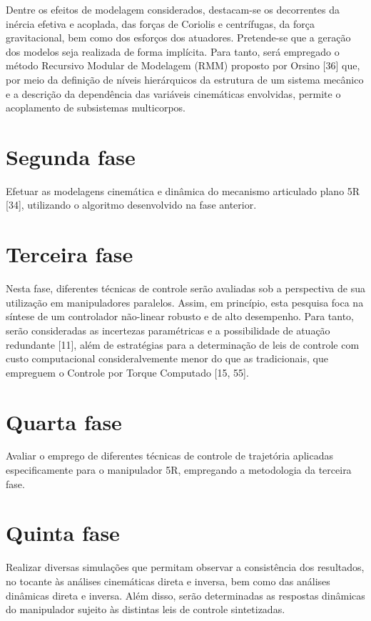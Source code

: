 \documentclass[]{politex}
\begin{document}
Dentre os efeitos de modelagem considerados, destacam-se os decorrentes da inércia efetiva e acoplada, das forças de Coriolis e centrífugas, da força gravitacional, bem como dos esforços dos atuadores. Pretende-se que a geração dos modelos seja realizada de forma implícita. Para tanto, será empregado o método Recursivo Modular de Modelagem (RMM) proposto por Orsino [36] que, por meio da definição de níveis hierárquicos da estrutura de um sistema mecânico e a descrição da dependência das variáveis cinemáticas envolvidas,  permite o acoplamento de subsistemas multicorpos.

\section{Segunda fase} 
Efetuar as modelagens cinemática e dinâmica do mecanismo articulado plano 5R [34], utilizando o algoritmo desenvolvido na fase anterior.

\section{Terceira fase} 
Nesta fase, diferentes técnicas de controle serão avaliadas sob a perspectiva de sua utilização em manipuladores paralelos. Assim, 
em princípio, esta pesquisa foca na síntese de um controlador não-linear robusto e de alto desempenho. Para tanto, serão consideradas as incertezas paramétricas e a possibilidade de atuação redundante [11], além de estratégias para a determinação de leis de controle com custo computacional
consideralvemente menor do que as tradicionais, que empreguem o Controle por Torque Computado [15, 55].

\section{Quarta fase} Avaliar o emprego de diferentes técnicas de controle de trajetória aplicadas especificamente para o manipulador 5R,
empregando a metodologia da terceira fase.

\section{Quinta fase} Realizar diversas simulações que permitam observar a consistência dos resultados, no tocante às análises cinemáticas direta e inversa, bem como das análises dinâmicas direta e inversa. Além disso, serão determinadas as respostas dinâmicas do manipulador sujeito às distintas leis de controle sintetizadas.
\end{document}
